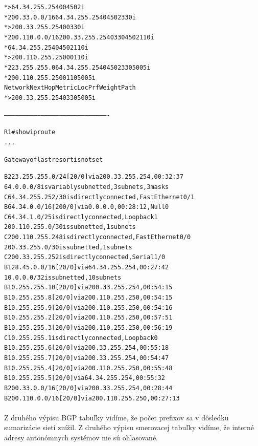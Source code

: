 \documentclass[12pt,twoside,a4paper]{report}
\begin{document}
{\begin{small}
\begin{alltt}
*>                  64.34.255.254            0             0 4502 i
*  200.33.0.0/16    64.34.255.254                          0 4502 330 i
*>                  200.33.255.254           0             0 330 i
*  200.110.0.0/16   200.33.255.254                         0 330 4502 110 i
*                   64.34.255.254                          0 4502 110 i
*>                  200.110.255.250          0             0 110 i
*  223.255.255.0    64.34.255.254                          0 4502 330 5005 i
*                   200.110.255.250                        0 110 5005 i
   Network          Next Hop            Metric LocPrf Weight Path
*>                  200.33.255.254                         0 330 5005 i


-------------------------------------------------------------------------------------


R1#show ip route
...

Gateway of last resort is not set

B    223.255.255.0/24 [20/0] via 200.33.255.254, 00:32:37
     64.0.0.0/8 is variably subnetted, 3 subnets, 3 masks
C       64.34.255.252/30 is directly connected, FastEthernet0/1
B       64.34.0.0/16 [200/0] via 0.0.0.0, 00:28:12, Null0
C       64.34.1.0/25 is directly connected, Loopback1
     200.110.255.0/30 is subnetted, 1 subnets
C       200.110.255.248 is directly connected, FastEthernet0/0
     200.33.255.0/30 is subnetted, 1 subnets
C       200.33.255.252 is directly connected, Serial1/0
B    128.45.0.0/16 [20/0] via 64.34.255.254, 00:27:42
     10.0.0.0/32 is subnetted, 10 subnets
B       10.255.255.10 [20/0] via 200.33.255.254, 00:54:15
B       10.255.255.8 [20/0] via 200.110.255.250, 00:54:15
B       10.255.255.9 [20/0] via 200.110.255.250, 00:54:16
B       10.255.255.2 [20/0] via 200.110.255.250, 00:57:51
B       10.255.255.3 [20/0] via 200.110.255.250, 00:56:19
C       10.255.255.1 is directly connected, Loopback0
B       10.255.255.6 [20/0] via 200.33.255.254, 00:55:18
B       10.255.255.7 [20/0] via 200.33.255.254, 00:54:47
B       10.255.255.4 [20/0] via 200.110.255.250, 00:55:48
B       10.255.255.5 [20/0] via 64.34.255.254, 00:55:32
B    200.33.0.0/16 [20/0] via 200.33.255.254, 00:28:44
B    200.110.0.0/16 [20/0] via 200.110.255.250, 00:27:13
\end{alltt}
\end{small}
}

\paragraph{}
Z druhého výpisu BGP tabuľky vidíme, že počet prefixov sa v dôsledku sumarizácie sietí znížil. Z druhého výpisu smerovacej tabuľky vidíme, že interné adresy autonómnych systémov nie sú ohlasované.
\end{document}

